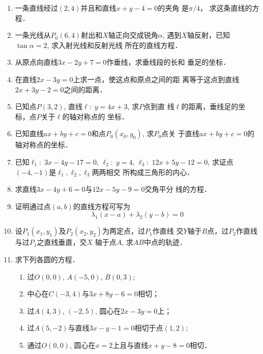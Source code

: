 \begin{enumerate}
\item 一条直线经过$(2,4)$并且和直线$x+y-4=0$的夹角
是$\pi/4$，
求这条直线的方程．
\item 一条光线从$P_0(6,4)$射出和$X$轴正向交成锐角$\alpha$, 
遇到$X$轴反射，已知$\tan\alpha=2$, 求入射光线和反射光线
所在的直线方程．
\item 从原点向直线$3x-2y+7=0$作垂线，求垂线段的长和
垂足的坐标．
\item 在直线$2x-3y=0$上求一点，使这点和原点之间的距
离等于这点到直线$2x+3y-2=0$之间的距离．
\item 已知点$P(3,2)$, 直线$\ell:\; y=4x+3$, 求$P$点到直
线$\ell$的距离，垂线足的坐标，点$P$关于$\ell$的轴对称点的
坐标．
\item 已知直线$ax+by+c=0$和点$P_0(x_0,y_0)$, 求$P_0$点关
于直线$ax+by+c=0$的轴对称点的坐标．
\item 已知$\ell_1:\; 3x-4y-17=0$, $\ell_2:\; y=4$, $\ell_3:\; 12x+5y-12=0$, 求证点$(-4,-1)$是$\ell_1,\ell_2,\ell_3$两两相交
所构成三角形的内心．
\item 求直线$3x-4y+6=0$与$12x-5y-9=0$交角平分
线的方程．
\item 证明通过点$(a,b)$的直线方程可写为
\[\lambda_1(x-a)+\lambda_2(y-b)=0\]
\item 设$P_1(x_1,y_1)$及$P_2(x_2,y_2)$为两定点，过$P_1$作直线
交$Y$轴于$B$点，过$P_2$作直线与过$P_1$之直线垂直，交$X$
轴于点$A$, 求$AB$中点的轨迹．
\item 求下列各圆的方程．
\begin{enumerate}
 \item 过$O(0,0)$, $A(-5,0)$, $B(0,3)$;
\item 中心在$C(-3,4)$与$3x+8y-6=0$相切；
\item 过$A(4,3)$, $(-2,5)$, 圆心在$2x-3y=0$上；
\item 过$A(5,-2)$与直线$3x-y-1=0$相切于点$(1,
2)$;
\item 通过$O(0,0)$, 圆心在$x=2$上且与直线$x+
y-8=0$相切．
\end{enumerate}


\end{enumerate}
